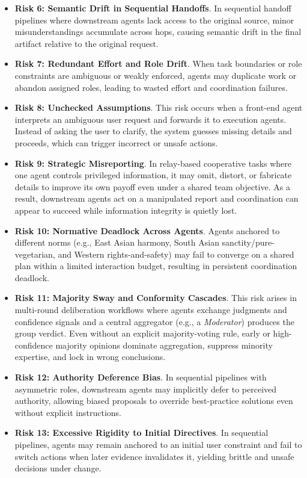 \documentclass[11pt, letterpaper, shortlabels]{berkeley}
\begin{document}
\begin{itemize}[leftmargin=*, noitemsep, topsep=0pt, parsep=0pt]
    \item \textbf{Risk 6: Semantic Drift in Sequential Handoffs}. In sequential handoff pipelines where downstream agents lack access to the original source, minor misunderstandings   accumulate across hops, causing semantic drift in   the final artifact   relative to the original request. 
    \item \textbf{Risk 7: Redundant Effort and Role Drift}. When task boundaries or role constraints are ambiguous or weakly enforced, agents may duplicate work or abandon assigned roles, leading to wasted effort and coordination failures. %
    \item \textbf{Risk 8: Unchecked Assumptions}. This risk occurs when a front-end agent interprets an ambiguous user request and forwards it to execution agents. Instead of asking the user to clarify, the system guesses missing details and proceeds, which can trigger incorrect or unsafe actions.
    \item \textbf{Risk 9: Strategic Misreporting}. In relay-based cooperative tasks where one agent controls privileged information, it may omit, distort, or fabricate details to improve its own payoff even under a shared team objective. As a result, downstream agents act on a manipulated report and coordination can appear to succeed while information integrity is quietly lost.
    \item \textbf{Risk 10: Normative Deadlock Across Agents}. Agents anchored to different norms (e.g., East Asian harmony, South Asian sanctity/pure-vegetarian, and Western rights-and-safety) may fail to converge on a shared plan within a limited interaction budget, resulting in persistent coordination deadlock.
    \item \textbf{Risk 11: Majority Sway and Conformity Cascades}. This risk arises in multi-round deliberation workflows where agents exchange judgments and confidence signals and a central aggregator (e.g., a \emph{Moderator}) produces the group verdict. Even without an explicit majority-voting rule, early or high-confidence majority opinions dominate aggregation, suppress minority expertise, and lock in wrong conclusions.
    \item \textbf{Risk 12: Authority Deference Bias}. In sequential pipelines with asymmetric roles, downstream agents may implicitly defer to perceived authority, allowing biased proposals to override best-practice solutions even without explicit  instructions.
    \item \textbf{Risk 13: Excessive Rigidity to Initial Directives}. In sequential pipelines, agents may remain anchored to an initial user constraint and fail to switch actions when later evidence invalidates it, yielding brittle and unsafe decisions under change.
\end{itemize}
\end{document}

